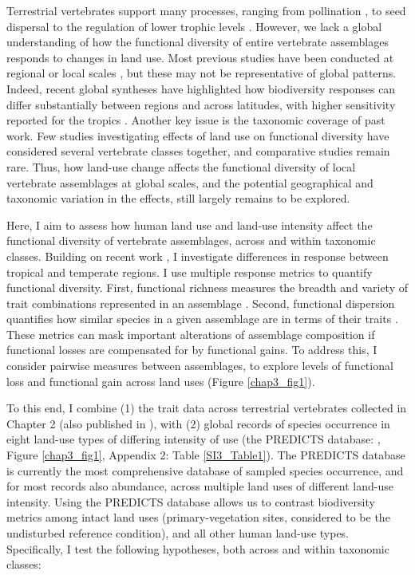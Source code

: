Terrestrial vertebrates support many processes, ranging from pollination \citep{Ratto2018}, to seed dispersal to the regulation of lower trophic levels \citep{Barber2010, Letnic2012, Salo2010,Zhang2018}. However, we lack a global understanding of how the functional diversity of entire vertebrate assemblages responds to changes in land use. Most previous studies have been conducted at regional or local scales \citep{Davison2021}, but these may not be representative of global patterns. Indeed, recent global syntheses have highlighted how biodiversity responses can differ substantially between regions and across latitudes, with higher sensitivity reported for the tropics \citep{Matuoka2020,Millard2021, Newbold2020}. Another key issue is the taxonomic coverage of past work. Few studies investigating effects of land use on functional diversity have considered several vertebrate classes together, and comparative studies remain rare. Thus, how land-use change affects the functional diversity of local vertebrate assemblages at global scales, and the potential geographical and taxonomic variation in the effects, still largely remains to be explored.

Here, I aim to assess how human land use and land-use intensity affect the functional diversity of vertebrate assemblages, across and within taxonomic classes. Building on recent work \citep{Matuoka2020,Millard2021, Newbold2020}, I investigate differences in response between tropical and temperate regions. I use multiple response metrics to quantify functional diversity. First, functional richness measures the breadth and variety of trait combinations represented in an assemblage \citep{Legras2018}. Second, functional dispersion quantifies how similar species in a given assemblage are in terms of their traits \citep{Laliberte2010}. These metrics can mask important alterations of assemblage composition if functional losses are compensated for by functional gains. To address this, I consider pairwise measures between assemblages, to explore levels of functional loss and functional gain across land uses (Figure \ref{chap3_fig1}).



To this end, I combine (1) the trait data across terrestrial vertebrates collected in Chapter 2 (also published in \citet{Etard2020}), with (2) global records of species occurrence in eight land-use types of differing intensity of use (the PREDICTS database: \citet{Hudson2014, Hudson2017}, Figure \ref{chap3_fig1}, Appendix 2: Table \ref{SI3_Table1}). The PREDICTS database is currently the most comprehensive database of sampled species occurrence, and for most records also abundance, across multiple land uses of different land-use intensity. Using the PREDICTS database allows us to contrast biodiversity metrics among intact land uses (primary-vegetation sites, considered to be the undisturbed reference condition), and all other human land-use types. Specifically, I test the following hypotheses, both across and within taxonomic classes:

